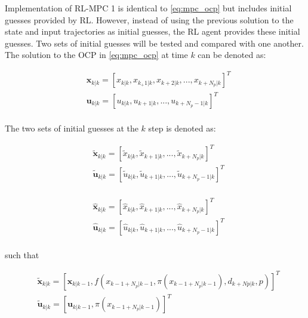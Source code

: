 Implementation of RL-MPC 1 is identical to \autoref{eq:mpc_ocp} but includes initial guesses provided by RL. However, instead of using the previous solution to the state and input trajectories as initial guesses, the RL agent provides these initial guesses. Two sets of initial guesses will be tested and compared with one another. The solution to the OCP in \autoref{eq:mpc_ocp} at time $k$ can be denoted as:

\begin{equation}\label{eq:sol-mpc-ocp}
	\begin{aligned}
		&\mathbf{x}_{k|k} = [x_{k|k},x_{k_+ 1|k},x_{k + 2|k}, ...,x_{k + N_p|k}]^T \\ 
		&\mathbf{u}_{k|k} = [u_{k|k},u_{k + 1|k}, ...,u_{k + N_p-1|k}]^T \\
	\end{aligned}
\end{equation}

The two sets of initial guesses at the $k$ step is denoted as:

\begin{equation}\label{eq:initial-guess-1}
	\begin{aligned}
		&\tilde{\mathbf{x}}_{k|k} = [\tilde{x}_{k|k},\tilde{x}_{k+1|k},...,\tilde{x}_{k + N_p|k}]^T \\ 
		&\tilde{\mathbf{u}}_{k|k} = [\tilde{u}_{k|k},\tilde{u}_{k + 1|k},...,\tilde{u}_{k + N_p - 1|k}]^T\\ 
	\end{aligned}
\end{equation}

\begin{equation}\label{eq:initial-guess-2}
	\begin{aligned}
		&\hat{\mathbf{x}}_{k|k} = [\hat{x}_{k|k},\hat{x}_{k+1|k},...,\hat{x}_{k + N_p|k}]^T \\ 
		&\hat{\mathbf{u}}_{k|k} = [\hat{u}_{k|k},\hat{u}_{k + 1|k},...,\hat{u}_{k + N_p - 1|k}]^T\\ 
	\end{aligned}
\end{equation}

such that

\begin{equation}\label{eq:horizon_extension}
	\begin{aligned}
		&\tilde{\mathbf{x}}_{k|k} = [\mathbf{x}_{k|k-1},f(x_{k-1 + N_p|k-1}, \pi(x_{k-1 + N_p|k-1}), d_{k+Np|k},p)]^T\\ 
		&\tilde{\mathbf{u}}_{k|k} = [\mathbf{u}_{k|k-1},\pi(x_{k-1 + N_p|k-1})]^T\\
	\end{aligned}
\end{equation}

